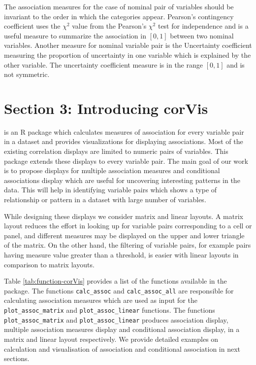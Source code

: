 The association measures for the case of nominal pair of variables
should be invariant to the order in which the categories appear.
Pearson's contingency coefficient uses the \({\chi}^2\) value from the
Pearson's \({\chi}^2\) test for independence and is a useful measure to
summarize the association in \([0,1]\) between two nominal variables.
Another measure for nominal variable pair is the Uncertainty coefficient
\citep{theil1970estimation} measuring the proportion of uncertainty in
one variable which is explained by the other variable. The uncertainty
coefficient measure is in the range \([0,1]\) and is not symmetric.

\hypertarget{section-3-introducing-corvis}{%
\section{Section 3: Introducing
corVis}\label{section-3-introducing-corvis}}

 is an R package which calculates measures of
association for every variable pair in a dataset and provides
visualizations for displaying associations. Most of the existing
correlation displays are limited to numeric pairs of variables. This
package extends these displays to every variable pair. The main goal of
our work is to propose displays for multiple association measures and
conditional associations display which are useful for uncovering
interesting patterns in the data. This will help in identifying variable
pairs which shows a type of relationship or pattern in a dataset with
large number of variables.

While designing these displays we consider matrix and linear layouts. A
matrix layout reduces the effort in looking up for variable pairs
corresponding to a cell or panel, and different measures may be
displayed on the upper and lower triangle of the matrix. On the other
hand, the filtering of variable pairs, for example pairs having measure
value greater than a threshold, is easier with linear layouts in
comparison to matrix layouts.

Table \ref{tab:function-corVis} provides a list of the functions
available in the package. The functions \texttt{calc\_assoc} and
\texttt{calc\_assoc\_all} are responsible for calculating association
measures which are used as input for the \texttt{plot\_assoc\_matrix}
and \texttt{plot\_assoc\_linear} functions. The functions
\texttt{plot\_assoc\_matrix} and \texttt{plot\_assoc\_linear} produces
association display, multiple association measures display and
conditional association display, in a matrix and linear layout
respectively. We provide detailed examples on calculation and
visualisation of association and conditional association in next
sections.

